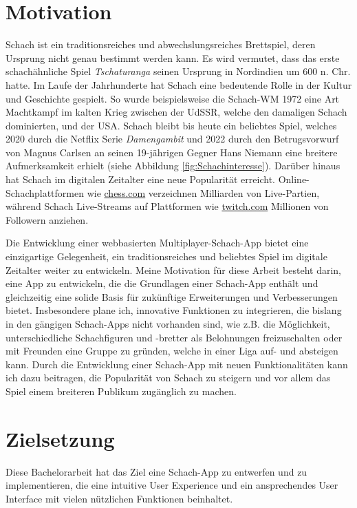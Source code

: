 \documentclass[a4paper,12pt]{report}
\newcommand{\footcite}[1]{\footnotemark\footnotetext{\cite{#1}}}
\begin{document}
    \section{Motivation}
    Schach ist ein traditionsreiches und abwechslungsreiches Brettspiel, deren Ursprung nicht genau bestimmt werden kann. Es wird vermutet, dass das erste schachähnliche Spiel  \textit{Tschaturanga} seinen Ursprung in Nordindien um 600 n. Chr. hatte\footcite{schachgeschichte}.
    Im Laufe der Jahrhunderte hat Schach eine bedeutende Rolle in der Kultur und Geschichte gespielt. So wurde beispielsweise die Schach-WM 1972 eine Art Machtkampf im kalten Krieg zwischen der UdSSR, welche den damaligen Schach dominierten, und der USA\footcite{bobby}.
    Schach bleibt bis heute ein beliebtes Spiel, welches 2020 durch die Netflix Serie \textit{Damengambit} und 2022 durch den Betrugsvorwurf von Magnus Carlsen an seinen 19-jährigen Gegner Hans Niemann\footcite{schachskandal} eine breitere Aufmerksamkeit erhielt (siehe Abbildung \ref{fig:Schachinteresse}). 
     Darüber hinaus hat Schach im digitalen Zeitalter eine neue Popularität erreicht. Online-Schachplattformen wie \url{chess.com} verzeichnen Milliarden von Live-Partien\footcite{chesscom3}, während Schach Live-Streams auf Plattformen wie \url{twitch.com} Millionen von Followern anziehen.
     
Die Entwicklung einer webbasierten Multiplayer-Schach-App bietet eine einzigartige Gelegenheit, ein traditionsreiches und beliebtes Spiel im digitale Zeitalter weiter zu entwickeln. Meine Motivation für diese Arbeit besteht darin, eine App zu entwickeln, die die Grundlagen einer Schach-App enthält und gleichzeitig eine solide Basis für zukünftige Erweiterungen und Verbesserungen bietet. Insbesondere plane ich, innovative Funktionen zu integrieren, die bislang in den gängigen Schach-Apps nicht vorhanden sind, wie z.B. die Möglichkeit, unterschiedliche Schachfiguren und -bretter als Belohnungen freizuschalten oder mit Freunden eine Gruppe zu gründen, welche in einer Liga auf- und absteigen kann. Durch die Entwicklung einer Schach-App mit neuen Funktionalitäten kann ich dazu beitragen, die Popularität von Schach zu steigern und vor allem das Spiel einem breiteren Publikum zugänglich zu machen.
    \section{Zielsetzung}
    Diese Bachelorarbeit hat das Ziel eine Schach-App zu entwerfen und zu implementieren, die eine intuitive User Experience und ein ansprechendes User Interface mit vielen nützlichen Funktionen beinhaltet.
    
\end{document}
